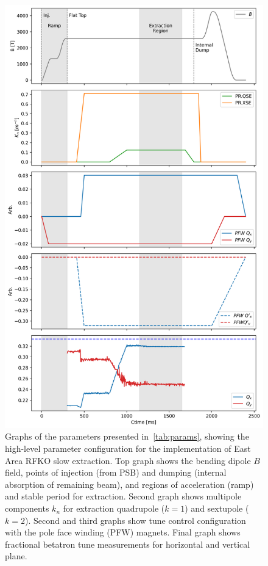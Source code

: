 \documentclass[11pt]{report}
\begin{document}
\begin{figure}
  \centering
  \includegraphics[width=0.6\linewidth]{cyclegraphs.png}
  \caption{Graphs of the parameters presented in~\autoref{tab:params}, showing the high-level parameter configuration for the implementation of East Area RFKO slow extraction. Top graph shows the bending dipole $B$ field, points of injection (from PSB) and dumping (internal absorption of remaining beam), and regions of acceleration (ramp) and stable period for extraction. Second graph shows multipole components $k_n$ for extraction quadrupole ($k=1$) and sextupole ($k=2$). Second and third graphs show tune control configuration with the pole face winding (PFW) magnets. Final graph shows fractional betatron tune measurements for horizontal and vertical plane.}\label{fig:cycle}
\end{figure}
\end{document}
